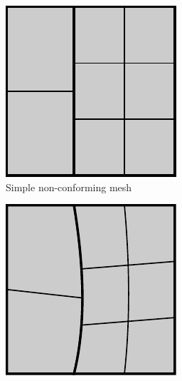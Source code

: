 \documentclass[preprint,12pt]{elsarticle}
\theoremstyle{remark}
\begin{document}
\begin{figure}[hbt]
    \centering
    \begin{subfigure}[b]{0.47\textwidth}
        \includegraphics[width=\textwidth]{two_patch_basic}
        \caption{Simple non-conforming mesh}\label{fig:two_patch_biharmonic_problem_basic}
    \end{subfigure}
    \begin{subfigure}[b]{0.47\textwidth}
        \includegraphics[width=\textwidth]{two_patch_distorted}

\end{subfigure}
\end{figure}
\end{document}
